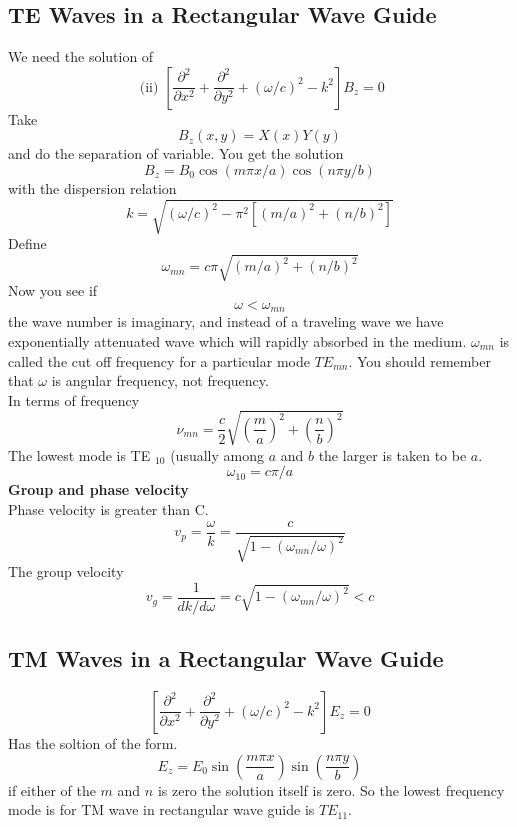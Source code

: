 \subsection{ TE Waves in a Rectangular Wave Guide}
We need the solution of
$$\text { (ii) }\left[\frac{\partial^{2}}{\partial x^{2}}+\frac{\partial^{2}}{\partial y^{2}}+(\omega / c)^{2}-k^{2}\right] B_{z}=0$$
Take $$
B_{z}(x, y)=X(x) Y(y)
$$
and do the separation of variable. You get the solution
$$
B_{z}=B_{0} \cos (m \pi x / a) \cos (n \pi y / b)
$$
with the dispersion relation
$$k=\sqrt{(\omega / c)^{2}-\pi^{2}\left[(m / a)^{2}+(n / b)^{2}\right]}$$
Define
$$
\omega_{m n}=c \pi \sqrt{(m / a)^{2}+(n / b)^{2}}
$$
Now you see if
$$
\omega<\omega_{m n}
$$
the wave number is imaginary, and instead of a traveling wave we have exponentially attenuated wave which will rapidly absorbed in the medium. $\omega_{m n}$ is called the cut off frequency for a particular mode $T E_{m n}$. You should remember that $\omega$ is angular frequency, not frequency.\\
In terms of frequency
$$
\nu_{m n}=\frac{c}{2} \sqrt{\left(\frac{m}{a}\right)^{2}+\left(\frac{n}{b}\right)^{2}}
$$
The lowest mode is TE $_{10}$ (usually among $a$ and $b$ the larger is taken to be $a$.
$$\omega_{10}=c \pi / a$$
\textbf{Group and phase velocity}\\
Phase velocity is greater than C.\\
$$v_{p}=\frac{\omega}{k}=\frac{c}{\sqrt{1-\left(\omega_{m n} / \omega\right)^{2}}}$$
The group velocity
$$
v_{g}=\frac{1}{d k / d \omega}=c \sqrt{1-\left(\omega_{m n} / \omega\right)^{2}}<c
$$
\subsection{ TM Waves in a Rectangular Wave Guide}
$$\left[\frac{\partial^{2}}{\partial x^{2}}+\frac{\partial^{2}}{\partial y^{2}}+(\omega / c)^{2}-k^{2}\right] E_{z}=0$$
Has the soltion of the form.
$$E_{z}=E_{0} \sin \left(\frac{m \pi x}{a}\right) \sin \left(\frac{n \pi y}{b}\right)$$
if either of the $m$ and $n$ is zero the solution itself is zero. So the lowest frequency mode is for TM wave in rectangular wave guide is $T E_{11}$.\\
